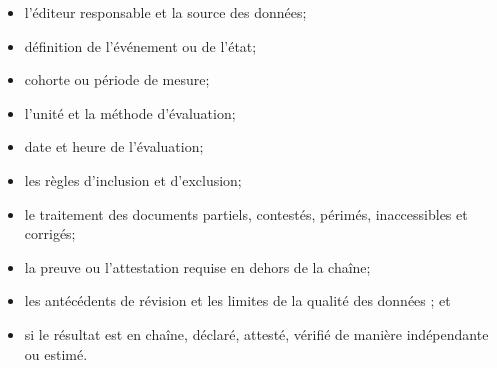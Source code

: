 \documentclass[11pt]{article}
\begin{document}
\begin{itemize}[leftmargin=*]
\item l'éditeur responsable et la source des données;
\item définition de l'événement ou de l'état;
\item cohorte ou période de mesure;
\item l'unité et la méthode d'évaluation;
\item date et heure de l'évaluation;
\item les règles d'inclusion et d'exclusion;
\item le traitement des documents partiels, contestés, périmés, inaccessibles et corrigés;
\item la preuve ou l'attestation requise en dehors de la chaîne;
\item les antécédents de révision et les limites de la qualité des données ; et
\item si le résultat est en chaîne, déclaré, attesté, vérifié de manière indépendante ou estimé.
\end{itemize}
\end{document}
